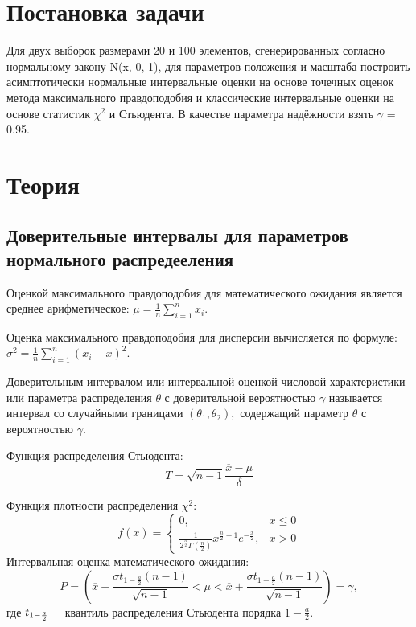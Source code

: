 \documentclass[a4]{article}
\begin{document}
	
	\newpage
	\tableofcontents{}
	\newpage
	\listoffigures
	\newpage
	\listoftables
	\newpage
	
	
	\section{Постановка задачи}
		Для двух выборок размерами 20 и 100 элементов, сгенерированных согласно нормальному закону N(x, 0, 1), для параметров положения и масштаба построить асимптотически нормальные интервальные оценки на основе точечных оценок метода максимального правдоподобия и классические интервальные оценки на основе статистик $\chi^2$ и Стьюдента. В качестве параметра надёжности взять $\gamma$ = 0.95.
	\section{Теория}
		\subsection{Доверительные интервалы для параметров нормального распредееления}
		Оценкой максимального правдоподобия для математического ожидания  является среднее арифметическое: $\mu=\frac{1}{n}\sum\limits_{i=1}^nx_i.$
		
		Оценка максимального правдоподобия для дисперсии вычисляется по формуле: $\sigma^2 = \frac{1}{n}\sum\limits_{i=1}^n(x_i-\overline{x})^2.$
		
		Доверительным интервалом или интервальной оценкой числовой характеристики или параметра распределения $\theta$ с доверительной вероятностью $\gamma$ называется интервал со случайными границами $(\theta_1,\theta_2),$ содержащий параметр $\theta$ с вероятностью $\gamma$.
		
		Функция распределения Стьюдента:
		$$
		T = \sqrt{n-1}\frac{\overline{x}-\mu}{\delta}
		$$
		
		Функция плотности распределения $\chi^2$:
		$$
		f(x) = \begin{cases}
		0,&x\leq 0\\
		\frac{1}{2^\frac{n}{2}\Gamma\left(\frac{n}{2}\right)}x^{\frac{n}{2}-1}e^{-\frac{x}{2}},& x>0
		\end{cases}
		$$
		Интервальная оценка математического ожидания:
		$$
		P=\left(\overline{x}-\frac{\sigma t_{1-\frac{a}{2}}(n-1)}{\sqrt{n-1}}<\mu<\overline{x}+\frac{\sigma t_{1-\frac{a}{2}}(n-1)}{\sqrt{n-1}}\right) = \gamma,
		$$
		где $t_{1-\frac{a}{2}}\;\--$ квантиль распределения Стьюдента порядка $1-\frac{a}{2}.$
		
\end{document}
